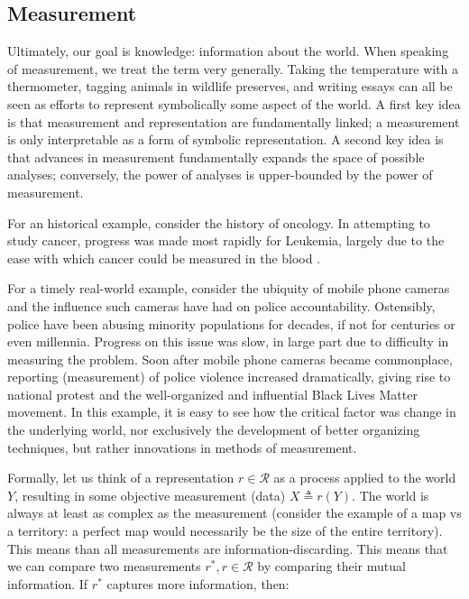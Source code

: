 \subsection{Measurement}

Ultimately, our goal is knowledge: information about the world.
When speaking of measurement, we treat the term very generally. Taking the temperature with a thermometer, tagging animals in wildlife preserves, and writing essays can all be seen as efforts to represent symbolically some aspect of the world.
A first key idea is that measurement and representation are fundamentally linked; a measurement is only interpretable as a form of symbolic representation.
A second key idea is that advances in measurement fundamentally expands the space of possible analyses; conversely, the power of analyses is upper-bounded by the power of measurement.

For an historical example, consider the history of oncology.
In attempting to study cancer, progress was made most rapidly for Leukemia, largely due to the ease with which cancer could be measured in the blood \cite{mukherjee}.

For a timely real-world example, consider the ubiquity of mobile phone cameras and the influence such cameras have had on police accountability.
Ostensibly, police have been abusing minority populations for decades, if not for centuries or even millennia.
Progress on this issue was slow, in large part due to difficulty in measuring the problem.
Soon after mobile phone cameras became commonplace, reporting (measurement) of police violence increased dramatically, giving rise to national protest and the well-organized and influential Black Lives Matter movement.
In this example, it is easy to see how the critical factor was change in the underlying world, nor exclusively the development of better organizing techniques, but rather innovations in methods of measurement.

\bigskip

Formally, let us think of a representation $r \in \mathcal{R}$ as a process applied to the world $Y$, resulting in some objective measurement (data) $X \triangleq r(Y)$.
The world is always at least as complex as the measurement (consider the example of a map vs a territory: a perfect map would necessarily be the size of the entire territory).
This means than all measurements are information-discarding.
This means that we can compare two measurements $r^*, r \in \mathcal{R}$ by comparing their mutual information.
If $r^*$ captures more information, then:

